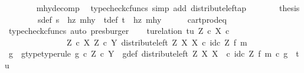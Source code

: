 \begin{isabellebody}
\ \ \ \ \ \ \isamarkupfalse%
\ mhy{\isacharunderscore}{\kern0pt}decomp\ \isamarkupfalse%
\ {\isacharparenleft}{\kern0pt}typecheck{\isacharunderscore}{\kern0pt}cfuncs{\isacharcomma}{\kern0pt}\ simp\ add{\isacharcolon}{\kern0pt}\ distribute{\isacharunderscore}{\kern0pt}left{\isacharunderscore}{\kern0pt}ap{\isacharparenright}{\kern0pt}\isanewline
\ \ \ \ \isamarkupfalse%
\ \isamarkupfalse%
\ {\isacharquery}{\kern0pt}thesis\isacommand{{\isachardot}{\kern0pt}}\isamarkupfalse%
\isanewline
\ \ \isamarkupfalse%
\isanewline
\ \ \isamarkupfalse%
\ \isamarkupfalse%
\ s{\isacharunderscore}{\kern0pt}def{\isacharcolon}{\kern0pt}\ {\isachardoublequoteopen}s\ {\isacharequal}{\kern0pt}\ {\isasymlangle}hz{\isacharcomma}{\kern0pt}\ mhy{}{\isasymrangle}{\isachardoublequoteclose}\ \ t{\isacharunderscore}{\kern0pt}def{\isacharcolon}{\kern0pt}\ {\isachardoublequoteopen}t\ {\isacharequal}{\kern0pt}\ {\isasymlangle}hz{\isacharcomma}{\kern0pt}\ mhy{}{\isasymrangle}{\isachardoublequoteclose}\isanewline
\ \ \ \ \isamarkupfalse%
\ cart{\isacharunderscore}{\kern0pt}prod{\isacharunderscore}{\kern0pt}eq{}\ \isamarkupfalse%
\ {\isacharparenleft}{\kern0pt}typecheck{\isacharunderscore}{\kern0pt}cfuncs{\isacharcomma}{\kern0pt}\ auto{\isacharcomma}{\kern0pt}\ presburger{\isacharparenright}{\kern0pt}\isanewline
\isanewline
\ \ \isamarkupfalse%
\ tu{\isacharunderscore}{\kern0pt}relation{\isacharcolon}{\kern0pt}\ {\isachardoublequoteopen}{\isasymlangle}t{\isacharcomma}{\kern0pt}u{\isasymrangle}\ {\isasymin}\isactrlbsub {\isacharparenleft}{\kern0pt}Z\ {\isasymtimes}\isactrlsub c\ X{\isacharparenright}{\kern0pt}\ {\isasymtimes}\isactrlsub c\isanewline
\ \ \ \ \ \ \ \ \ \ \ \ \ \ \ Z\ {\isasymtimes}\isactrlsub c\ X\isactrlesub \ {\isacharparenleft}{\kern0pt}Z\ {\isasymtimes}\isactrlsub c\ Y{\isacharcomma}{\kern0pt}\ distribute{\isacharunderscore}{\kern0pt}left\ Z\ X\ X\ {\isasymcirc}\isactrlsub c\ id\isactrlsub c\ Z\ {\isasymtimes}\isactrlsub f\ m{\isacharparenright}{\kern0pt}{\isachardoublequoteclose}\isanewline
\ \ \isamarkupfalse%
\ \isamarkupfalse%
\ g\ \ g{\isacharunderscore}{\kern0pt}type{\isacharbrackleft}{\kern0pt}type{\isacharunderscore}{\kern0pt}rule{\isacharbrackright}{\kern0pt}{\isacharcolon}{\kern0pt}\ {\isachardoublequoteopen}g\ {\isasymin}\isactrlsub c\ Z\ {\isasymtimes}\isactrlsub c\ Y{\isachardoublequoteclose}\ \ g{\isacharunderscore}{\kern0pt}def{\isacharcolon}{\kern0pt}\ {\isachardoublequoteopen}{\isacharparenleft}{\kern0pt}distribute{\isacharunderscore}{\kern0pt}left\ Z\ X\ X\ \ {\isasymcirc}\isactrlsub c\ id\isactrlsub c\ Z\ {\isasymtimes}\isactrlsub f\ m{\isacharparenright}{\kern0pt}\ {\isasymcirc}\isactrlsub c\ g\ {\isacharequal}{\kern0pt}\ {\isasymlangle}t{\isacharcomma}{\kern0pt}u{\isasymrangle}{\isachardoublequoteclose}\isanewline

\end{isabellebody}
